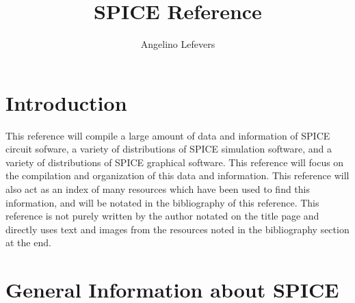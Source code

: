 \documentclass{article}
\begin{document}
\title{SPICE Reference}
\author{Angelino Lefevers}
\maketitle
\thispagestyle{empty}
\cleardoublepage
\tableofcontents
\thispagestyle{empty}
\cleardoublepage
\section*{Introduction}
This reference will compile a large amount of data and information of SPICE circuit sofware, a variety of distributions of SPICE simulation software, and a variety of distributions of SPICE graphical software. This reference will focus on the compilation and organization of this data and information. This reference will also act as an index of many resources which have been used to find this information, and will be notated in the bibliography of this reference. This reference is not purely written by the author notated on the title page and directly uses text and images from the resources noted in the bibliography section at the end.
\cleardoublepage 
\setcounter{page}{1}
\section{General Information about SPICE}
% 
\end{document}
